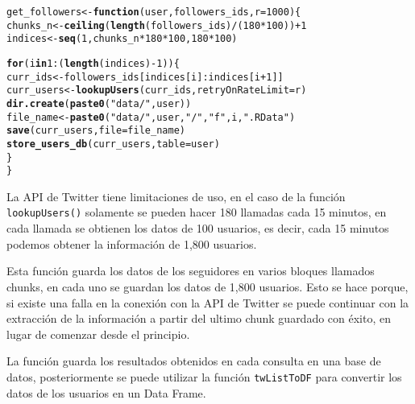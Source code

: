 \documentclass[openright, 12pt, twoside]{report}\usepackage[]{graphicx}\usepackage[]{color}
\makeatletter
\newcommand{\hlnum}[1]{\textcolor[rgb]{0.686,0.059,0.569}{#1}}%
\newcommand{\hlstr}[1]{\textcolor[rgb]{0.192,0.494,0.8}{#1}}%
\newcommand{\hlopt}[1]{\textcolor[rgb]{0,0,0}{#1}}%
\newcommand{\hlstd}[1]{\textcolor[rgb]{0.345,0.345,0.345}{#1}}%
\newcommand{\hlkwa}[1]{\textcolor[rgb]{0.161,0.373,0.58}{\textbf{#1}}}%
\newcommand{\hlkwb}[1]{\textcolor[rgb]{0.69,0.353,0.396}{#1}}%
\newcommand{\hlkwc}[1]{\textcolor[rgb]{0.333,0.667,0.333}{#1}}%
\newcommand{\hlkwd}[1]{\textcolor[rgb]{0.737,0.353,0.396}{\textbf{#1}}}%
\newenvironment{kframe}{%
 \def\at@end@of@kframe{}%
 \ifinner\ifhmode%
  \def\at@end@of@kframe{\end{minipage}}%
  \begin{minipage}{\columnwidth}%
 \fi\fi%
 \def\FrameCommand##1{\hskip\@totalleftmargin \hskip-\fboxsep
 \colorbox{shadecolor}{##1}\hskip-\fboxsep
     \hskip-\linewidth \hskip-\@totalleftmargin \hskip\columnwidth}%
 \MakeFramed {\advance\hsize-\width
   \@totalleftmargin\z@ \linewidth\hsize
   \@setminipage}}%
 {\par\unskip\endMakeFramed%
 \at@end@of@kframe}
\newenvironment{knitrout}{}{} %
\makeatother
\begin{document}
\begin{knitrout}\small
{}\color{fgcolor}\begin{kframe}
\begin{alltt}
\hlstd{get_followers} \hlkwb{<-} \hlkwa{function}\hlstd{(}\hlkwc{user}\hlstd{,} \hlkwc{followers_ids}\hlstd{,} \hlkwc{r} \hlstd{=} \hlnum{1000}\hlstd{) \{}
    \hlstd{chunks_n} \hlkwb{<-} \hlkwd{ceiling}\hlstd{(}\hlkwd{length}\hlstd{(followers_ids)}\hlopt{/}\hlstd{(}\hlnum{180} \hlopt{*} \hlnum{100}\hlstd{))} \hlopt{+} \hlnum{1}
    \hlstd{indices} \hlkwb{<-} \hlkwd{seq}\hlstd{(}\hlnum{1}\hlstd{, chunks_n} \hlopt{*} \hlnum{180} \hlopt{*} \hlnum{100}\hlstd{,} \hlnum{180} \hlopt{*} \hlnum{100}\hlstd{)}

    \hlkwa{for} \hlstd{(i} \hlkwa{in} \hlnum{1}\hlopt{:}\hlstd{(}\hlkwd{length}\hlstd{(indices)} \hlopt{-} \hlnum{1}\hlstd{)) \{}
        \hlstd{curr_ids} \hlkwb{<-} \hlstd{followers_ids[indices[i]}\hlopt{:}\hlstd{indices[i} \hlopt{+} \hlnum{1}\hlstd{]]}
        \hlstd{curr_users} \hlkwb{<-} \hlkwd{lookupUsers}\hlstd{(curr_ids,} \hlkwc{retryOnRateLimit} \hlstd{= r)}
        \hlkwd{dir.create}\hlstd{(}\hlkwd{paste0}\hlstd{(}\hlstr{"data/"}\hlstd{, user))}
        \hlstd{file_name} \hlkwb{<-} \hlkwd{paste0}\hlstd{(}\hlstr{"data/"}\hlstd{, user,} \hlstr{"/"}\hlstd{,} \hlstr{"f"}\hlstd{, i,} \hlstr{".RData"}\hlstd{)}
        \hlkwd{save}\hlstd{(curr_users,} \hlkwc{file} \hlstd{= file_name)}
        \hlkwd{store_users_db}\hlstd{(curr_users,} \hlkwc{table} \hlstd{= user)}
    \hlstd{\}}
\hlstd{\}}
\end{alltt}
\end{kframe}
\end{knitrout}

La API de Twitter tiene limitaciones de uso, en el caso de la función \texttt{lookupUsers()} solamente se pueden hacer 180 llamadas cada 15 minutos, en cada llamada se obtienen los datos de 100 usuarios, es decir, cada 15 minutos podemos obtener la información de 1,800 usuarios.

Esta función guarda los datos de los seguidores en varios bloques llamados chunks, en cada uno se guardan los datos de 1,800 usuarios. Esto se hace porque, si existe una falla en la conexión con la API de Twitter se puede continuar con la extracción de la información a partir del ultimo chunk guardado con éxito, en lugar de comenzar desde el principio.

La función guarda los resultados obtenidos en cada consulta en una base de datos, posteriormente se puede utilizar la función \texttt{twListToDF} para convertir los datos de los usuarios en un Data Frame.
\end{document}
